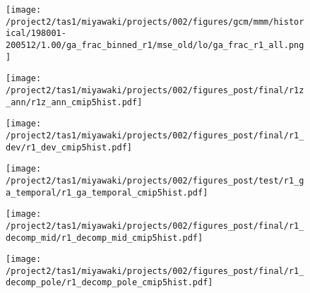 \documentclass{ametsocV5}
\begin{document}
\begin{figure}[t]
  \noindent\texttt{[image: /project2/tas1/miyawaki/projects/002/figures/gcm/mmm/historical/198001-200512/1.00/ga\_frac\_binned\_r1/mse\_old/lo/ga\_frac\_r1\_all.png]}\\
  \label{fig:cmip5-binned-r1}
\end{figure}

\begin{figure}[t]
  \noindent\texttt{[image: /project2/tas1/miyawaki/projects/002/figures\_post/final/r1z\_ann/r1z\_ann\_cmip5hist.pdf]}\\
  \label{fig:cmip5hist-r1-ann}
\end{figure}

\begin{figure}[t]
  \noindent\texttt{[image: /project2/tas1/miyawaki/projects/002/figures\_post/final/r1\_dev/r1\_dev\_cmip5hist.pdf]}\\
  \label{fig:cmip5hist-r1-dev}
\end{figure}

\begin{figure}[t]
  \noindent\texttt{[image: /project2/tas1/miyawaki/projects/002/figures\_post/test/r1\_ga\_temporal/r1\_ga\_temporal\_cmip5hist.pdf]}\\
  \label{fig:cmip5hist-r1-ga-temporal}
\end{figure}

\begin{figure}[t]
  \noindent\texttt{[image: /project2/tas1/miyawaki/projects/002/figures\_post/final/r1\_decomp\_mid/r1\_decomp\_mid\_cmip5hist.pdf]}\\
  \label{fig:cmip5hist-r1-decomp-mid}
\end{figure}

\begin{figure}[t]
  \noindent\texttt{[image: /project2/tas1/miyawaki/projects/002/figures\_post/final/r1\_decomp\_pole/r1\_decomp\_pole\_cmip5hist.pdf]}\\
  \label{fig:cmip5hist-r1-decomp-pole}
\end{figure}
\end{document}
